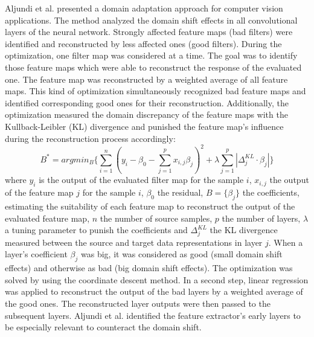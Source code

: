 Aljundi et al. \cite{Aljundi2016} presented a domain adaptation approach for computer vision applications. The method analyzed the domain shift effects in all convolutional layers of the neural network. Strongly affected feature maps (bad filters) were identified and reconstructed by less affected ones (good filters). During the optimization, one filter map was considered at a time. The goal was to identify those feature maps which were able to reconstruct the response of the evaluated one. The feature map was reconstructed by a weighted average of all feature maps. This kind of optimization simultaneously recognized bad feature maps and identified corresponding good ones for their reconstruction. Additionally, the optimization measured the domain discrepancy of the feature maps with the Kullback-Leibler (KL) divergence and punished the feature map's influence during the reconstruction process accordingly:  
\begin{equation}
    B^{*} = argmin_{B} \{ \sum_{i=1}^{n}( y_{i}-\beta_{0}-\sum_{j=1}^{p}x_{i,j}\beta_{j})^{2} + \lambda \sum_{j=1}^{p}|\Delta_{j}^{KL}\cdot \beta_{j}| \}
\end{equation}
where $y_{i}$ is the output of the evaluated filter map for the sample $i$, $x_{i,j}$ the output of the feature map $j$ for the sample $i$, $\beta_{0}$ the residual, $B = \{\beta_{j}\}$ the coefficients, estimating the suitability of each feature map to reconstruct the output of the evaluated feature map, $n$ the number of source samples, $p$ the number of layers, $\lambda$ a tuning parameter to punish the coefficients and $\Delta_{j}^{KL}$ the KL divergence measured between the source and target data representations in layer $j$. When a layer's coefficient  $\beta_{j}$ was big, it was considered as good (small domain shift effects) and otherwise as bad (big domain shift effects). The optimization was solved by using the coordinate descent method. In a second step, linear regression was applied to reconstruct the output of the bad layers by a weighted average of the good ones. The reconstructed layer outputs were then passed to the subsequent layers. Aljundi et al. \cite{Aljundi2016} identified the feature extractor's early layers to be especially relevant to counteract the domain shift.

